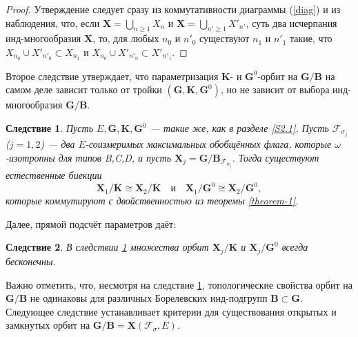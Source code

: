 \documentclass{amsart}
\newtheorem{corollary}{Следствие}
\theoremstyle{definition}
\begin{document}
\begin{proof}
	Утверждение следует сразу из коммутативности диаграммы (\ref{diag})  и из наблюдения, что, если  $\mathbf{X}= \bigcup_{n \geq 1} X_n$ и  $\mathbf{X}= \bigcup_{n' \geq 1} X'_{n'}$, суть два исчерпания инд-многообразия  $\mathbf{X}$, то, для любых $n_0$ и $n'_0$ существуют $n_1$ и $n'_1$ такие, что $X_{n_0}\cup X'_{n'_0} \subset X_{n_1}$ и $X_{n_0}\cup X'_{n'_0} \subset X'_{n'_1}$.
\end{proof}
Второе следствие утверждает, что параметризация $\mathbf{K}$- и $\mathbf{G}^0$-орбит на $\mathbf{G}/\mathbf{B}$ на самом деле зависит только от тройки $\left(\mathbf{G},\mathbf{K},\mathbf{G}^0\right)$, но не зависит от выбора инд-многообразия  $\mathbf{G}/\mathbf{B}$.

\begin{corollary}
\label{C1}
Пусть $E,\mathbf{G},\mathbf{K},\mathbf{G}^0$ --- такие же, как  в  разделе \ref{S2.1}.
Пусть $\mathcal{F}_{\sigma_j}$ ($j=1,2$) --- два
$E$-соизмеримых
максимальных обобщённых флага, которые $\omega$-изотропны для типов B,C,D,
и пусть $\mathbf{X}_j=\mathbf{G}/\mathbf{B}_{\mathcal{F}_{\sigma_j}}$.
Тогда существуют естественные биекции
\[
\mathbf{X}_1/\mathbf{K}\cong\mathbf{X}_2/\mathbf{K}
\quad\mbox{и}\quad
\mathbf{X}_1/\mathbf{G}^0\cong\mathbf{X}_2/\mathbf{G}^0,
\]
 которые коммутируют с двойственностью из теоремы \ref{theorem-1}.
\end{corollary}

Далее, прямой подсчёт параметров даёт:

\begin{corollary}
\label{C2}
В следствии \ref{C1}
множества орбит $\mathbf{X}_j/\mathbf{K}$ и $\mathbf{X}_j/\mathbf{G}^0$
всегда бесконечны.
\end{corollary}


Важно отметить, что, несмотря на следствие \ref{C1}, топологические свойства орбит на $\mathbf{G}/\mathbf{B}$ не одинаковы для различных Борелевских инд-подгрупп $\mathbf{B}\subset\mathbf{G}$.  Следующее следствие устанавливает критерии для существования открытых и замкнутых орбит на $\mathbf{G}/\mathbf{B}=\mathbf{X}\left(\mathcal{F}_\sigma,E\right)$.
\end{document}
